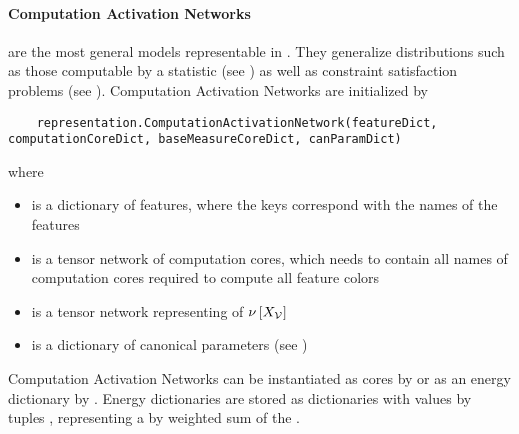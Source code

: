 \paragraph{Computation Activation Networks} are the most general models representable in \tnreason.
They generalize distributions such as those computable by a statistic (see ) as well as constraint satisfaction problems (see ).
Computation Activation Networks are initialized by
\begin{lstlisting}
	representation.ComputationActivationNetwork(featureDict, computationCoreDict, baseMeasureCoreDict, canParamDict)
\end{lstlisting}
where
\begin{itemize}
    \item {} is a dictionary of features, where the keys correspond with the names of the features
    \item {} is a tensor network of computation cores, which needs to contain all names of computation cores required to compute all feature colors
    \item {} is a tensor network representing of $\nu\left[X_{\mathcal{V}}\right]$
    \item {} is a dictionary of canonical parameters (see )
\end{itemize}
Computation Activation Networks can be instantiated as cores by  or as an energy dictionary by .
Energy dictionaries are stored as dictionaries with values by tuples , representing a by  weighted sum of the .

